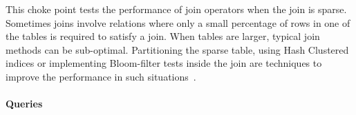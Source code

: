 
This choke point tests the performance of join operators when the join is sparse. Sometimes joins involve relations where only a small percentage of rows in one of the tables is required to satisfy a join. When tables are larger, typical join methods can be sub-optimal. Partitioning the sparse table, using Hash Clustered indices or implementing Bloom-filter tests inside the join are techniques to improve the performance in such situations~\cite{DBLP:journals/csur/Graefe93}.


\paragraph{Queries}
{\raggedright

}